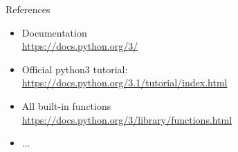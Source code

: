 \documentclass[10pt]{beamer}
\begin{document}

\begin{frame}[fragile]{References}

    \begin{itemize}
        \item Documentation\\
            \url{https://docs.python.org/3/}
        \item \pause Official python3 tutorial:\\
            \url{https://docs.python.org/3.1/tutorial/index.html}
        \item \pause All built-in functions\\
        	\url{https://docs.python.org/3/library/functions.html}
        \item \pause ...

    \end{itemize}

\end{frame}
\end{document}
